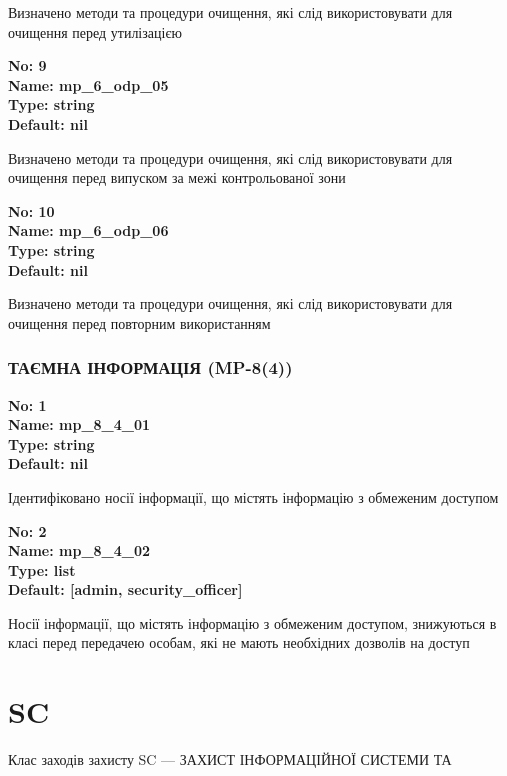 \documentclass{article}
\begin{document}
{\footnotesize Визначено методи та процедури очищення, які слід використовувати для очищення перед утилізацією}


{\footnotesize\bfseries
No: 9\\
Name: mp\_\allowbreak{}6\_\allowbreak{}odp\_\allowbreak{}05\\
Type: string\\
Default: nil
}

{\footnotesize Визначено методи та процедури очищення, які слід використовувати для очищення перед випуском за межі контрольованої зони}


{\footnotesize\bfseries
No: 10\\
Name: mp\_\allowbreak{}6\_\allowbreak{}odp\_\allowbreak{}06\\
Type: string\\
Default: nil
}

{\footnotesize Визначено методи та процедури очищення, які слід використовувати для очищення перед повторним використанням}




\subsubsection{ТАЄМНА ІНФОРМАЦІЯ (MP-8(4))}


\vspace{10pt}
{\footnotesize\bfseries
No: 1\\
Name: mp\_\allowbreak{}8\_\allowbreak{}4\_\allowbreak{}01\\
Type: string\\
Default: nil
}

{\footnotesize Ідентифіковано носії інформації, що містять інформацію з обмеженим доступом}


{\footnotesize\bfseries
No: 2\\
Name: mp\_\allowbreak{}8\_\allowbreak{}4\_\allowbreak{}02\\
Type: list\\
Default: [\textquotedbl{}admin\textquotedbl{}, \textquotedbl{}security\_\allowbreak{}officer\textquotedbl{}]
}

{\footnotesize Носії інформації, що містять інформацію з обмеженим доступом, знижуються в класі перед передачею особам, які не мають необхідних дозволів на доступ}




\section{SC}
Клас заходів захисту SC --- ЗАХИСТ ІНФОРМАЦІЙНОЇ СИСТЕМИ ТА
\end{document}
